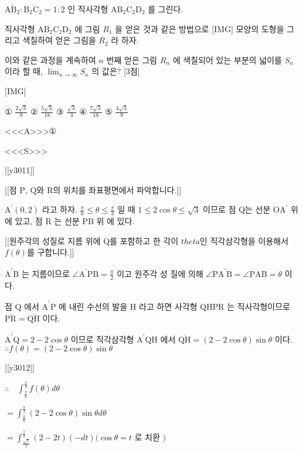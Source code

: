 \documentclass{oblivoir}
\begin{document}
$\overline{\mathrm{AB}_{2}}: \overline{\mathrm{B}_{2} \mathrm{C}_{2}}=1: 2$ 인 
직사각형 $\mathrm{AB}_{2} \mathrm{C}_{2} \mathrm{D}_{2}$ 를 그린다.

직사각형 $\mathrm{AB}_{2} \mathrm{C}_{2} \mathrm{D}_{2}$ 에 그림 $R_{1}$ 을 얻은 것과 같은 방법으로 [IMG] 모양의 도형을 
그리고 색칠하여 얻은 그림을 $R_{2}$ 라 하자.

이와 같은 과정을 계속하여 $n$ 번째 얻은 그림 $R_{n}$ 에 색칠되어 있는 부분의 넓이를 $S_{n}$ 이라 할 때, 
$\displaystyle \lim _{n \rightarrow \infty} S_{n}$ 의 값은? [3점]


[IMG]

① $\frac{2 \sqrt{3}}{9}$
② $\frac{5 \sqrt{3}}{18}$
③ $\frac{\sqrt{3}}{3}$
④ $\frac{7 \sqrt{3}}{18}$
⑤ $\frac{4 \sqrt{3}}{9}$


<<<A>>>①

<<<S>>>

[[y3011]]

[[점 $\mathrm{P}$, $\mathrm{Q}$와 $\mathrm{R}$의 위치를 좌표평면에서 파악합니다.]]

$\mathrm{A}^{\prime}(0,2)$ 라고 하자. 
$\frac{\pi}{6} \leq \theta \leq \frac{\pi}{3}$ 일 때 $1 \leq 2 \cos \theta \leq \sqrt{3}$ 이므로 
점 Q는 선분 $\mathrm{OA}^{\prime}$ 위에 있고, 점 $\mathrm{R}$ 는 선분 $\mathrm{PB}$ 위 에 있다.

[[원주각의 성질로 지름 위에 $\mathrm{Q}$를 포함하고 한 각이 $theta$인 직각삼각형을 이용해서 $f(\theta)$를 구합니다.]]

$\overline{\mathrm{A}^{\prime} \mathrm{B}}$ 는 지름이므로 $\angle \mathrm{A}^{\prime} \mathrm{PB}=\frac{\pi}{2}$ 이고 
원주각 성 질에 의해 $\angle \mathrm{PA}^{\prime} \mathrm{B}=\angle \mathrm{P} \mathrm{AB}=\theta$ 이다.

점 $\mathrm{Q}$ 에서 $\overline{\mathrm{A}^{\prime} \mathrm{P}}$ 에 내린 수선의 발을 $\mathrm{H}$ 라고 하면 
사각형 $\mathrm{QHPR}$ 는 직사각형이므로 $\overline{\mathrm{PR}}=\overline{\mathrm{QH}}$ 이다.

$\overline{\mathrm{A}^{\prime} \mathrm{Q}}=2-2 \cos \theta$ 이므로
직각삼각형 $\mathrm{A}^{\prime} \mathrm{QH}$ 에서
$\overline{\mathrm{QH}}=(2-2 \cos \theta) \sin \theta$ 이다.
$\therefore f(\theta)=(2-2 \cos \theta) \sin \theta$

[[y3012]]

$\therefore \quad \int_{\frac{\pi}{6}}^{\frac{\pi}{3}} f(\theta) d \theta$

$=\int_{\frac{\pi}{6}}^{\frac{\pi}{3}}(2-2 \cos \theta) \sin \theta d \theta$

$=\int_{\frac{\sqrt{3}}{2}}^{\frac{1}{2}}(2-2 t)(-d t)(\cos \theta=t$ 로 치환 $)$
\end{document}
